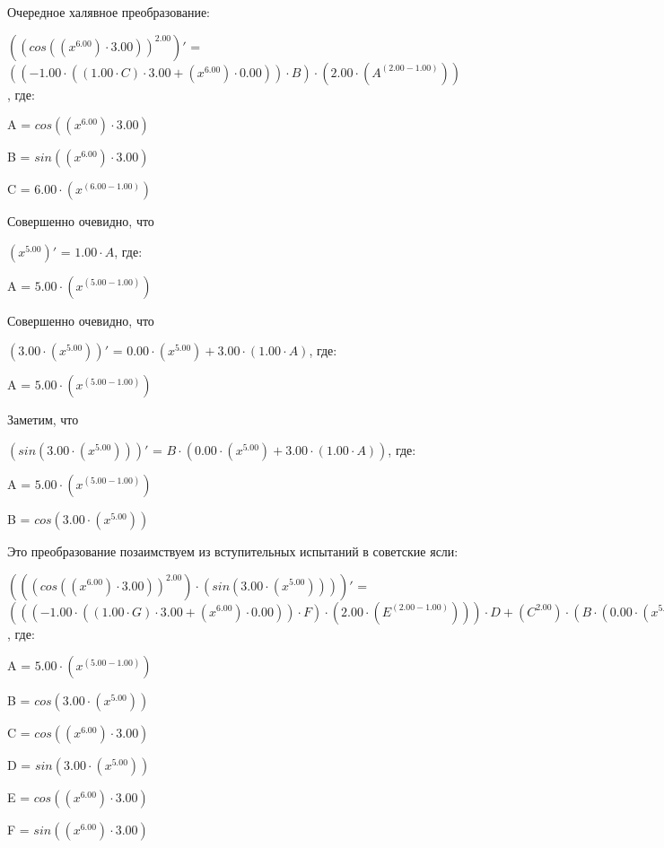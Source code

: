 \documentclass{article}
\begin{document}
\bigskip Очередное халявное преобразование:

$({(cos(({x}^{6.00}) \cdot 3.00))}^{2.00})'$ = $((-1.00 \cdot ((1.00 \cdot C) \cdot 3.00 + ({x}^{6.00}) \cdot 0.00)) \cdot B) \cdot (2.00 \cdot ({A}^{(2.00 - 1.00)}))$, где:

\bigskip\qquad A = $cos(({x}^{6.00}) \cdot 3.00)$

\qquad B = $sin(({x}^{6.00}) \cdot 3.00)$

\qquad C = $6.00 \cdot ({x}^{(6.00 - 1.00)})$



\bigskip Совершенно очевидно, что

$({x}^{5.00})'$ = $1.00 \cdot A$, где:

\bigskip\qquad A = $5.00 \cdot ({x}^{(5.00 - 1.00)})$



\bigskip Совершенно очевидно, что

$(3.00 \cdot ({x}^{5.00}))'$ = $0.00 \cdot ({x}^{5.00}) + 3.00 \cdot (1.00 \cdot A)$, где:

\bigskip\qquad A = $5.00 \cdot ({x}^{(5.00 - 1.00)})$



\bigskip Заметим, что

$(sin(3.00 \cdot ({x}^{5.00})))'$ = $B \cdot (0.00 \cdot ({x}^{5.00}) + 3.00 \cdot (1.00 \cdot A))$, где:

\bigskip\qquad A = $5.00 \cdot ({x}^{(5.00 - 1.00)})$

\qquad B = $cos(3.00 \cdot ({x}^{5.00}))$



\bigskip Это преобразование позаимствуем из вступительных испытаний в советские ясли:

$(({(cos(({x}^{6.00}) \cdot 3.00))}^{2.00}) \cdot (sin(3.00 \cdot ({x}^{5.00}))))'$ = $(((-1.00 \cdot ((1.00 \cdot G) \cdot 3.00 + ({x}^{6.00}) \cdot 0.00)) \cdot F) \cdot (2.00 \cdot ({E}^{(2.00 - 1.00)}))) \cdot D + ({C}^{2.00}) \cdot (B \cdot (0.00 \cdot ({x}^{5.00}) + 3.00 \cdot (1.00 \cdot A)))$, где:

\bigskip\qquad A = $5.00 \cdot ({x}^{(5.00 - 1.00)})$

\qquad B = $cos(3.00 \cdot ({x}^{5.00}))$

\qquad C = $cos(({x}^{6.00}) \cdot 3.00)$

\qquad D = $sin(3.00 \cdot ({x}^{5.00}))$

\qquad E = $cos(({x}^{6.00}) \cdot 3.00)$

\qquad F = $sin(({x}^{6.00}) \cdot 3.00)$
\end{document}
